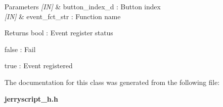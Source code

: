 \begin{DoxyParams}{Parameters}
{\em \mbox{[}\+I\+N\mbox{]}} & button\+\_\+index\+\_\+d \+: Button index \\
\hline
{\em \mbox{[}\+I\+N\mbox{]}} & event\+\_\+fct\+\_\+str \+: Function name \\
\hline
\end{DoxyParams}
\begin{DoxyReturn}{Returns}
bool \+: Event register status \begin{DoxyItemize}
\item false \+: Fail \item true \+: Event registered \end{DoxyItemize}

\end{DoxyReturn}


The documentation for this class was generated from the following file\+:\begin{DoxyCompactItemize}
\item 
\textbf{ jerryscript\+\_\+h.\+h}\end{DoxyCompactItemize}
